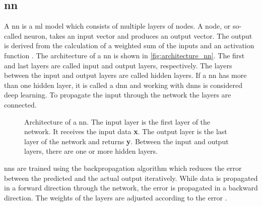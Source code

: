 \subsection{\acl*{nn}}\label{sec:neural_network}

A \ac{nn} is a \ac{ml} model which consists of multiple layers of nodes.
A node, or so-called neuron, takes an input vector and produces an output vector.
The output is derived from the calculation of a weighted sum of the inputs and an activation function \cite{KI2022}.
The architecture of a \ac{nn} is shown in \autoref{fig:architecture_nn}.
The first and last layers are called input and output layers, respectively.
The layers between the input and output layers are called hidden layers.
If a \ac{nn} has more than one hidden layer, it is called a \ac{dnn} and working with \acp{dnn} is considered deep learning.
To propagate the input through the network the layers are connected.

\begin{figure}[!htb] %
    \centering
    
    \caption[Architecture of a \acs*{nn}]
    {Architecture of a \acs*{nn}. 
    The input layer is the first layer of the network.
    It receives the input data \textbf{x}.
    The output layer is the last layer of the network and returns \textbf{y}.
    Between the input and output layers, there are one or more hidden layers.
    }
    \label{fig:architecture_nn}
\end{figure}

\acp{nn} are trained using the backpropagation algorithm which reduces the error between the predicted and the actual output iteratively.
While data is propagated in a forward direction through the network, the error is propagated in a backward direction.
The weights of the layers are adjusted according to the error \cite{KI2022}.

